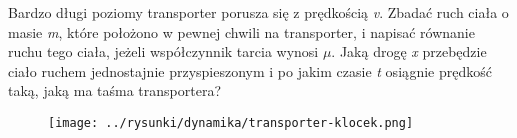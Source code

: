 Bardzo długi poziomy transporter porusza się z prędkością \emph{v}. Zbadać ruch ciała o masie \emph{m}, które położono w pewnej chwili na transporter, i napisać równanie ruchu tego ciała, jeżeli współczynnik tarcia wynosi \emph{$\mu$}. Jaką drogę \emph{x} przebędzie ciało ruchem jednostajnie przyspieszonym i po jakim czasie \emph{t} osiągnie prędkość taką, jaką ma taśma transportera?

\begin{figure}[H]
	\centering
	\texttt{[image: ../rysunki/dynamika/transporter-klocek.png]}
\end{figure}

